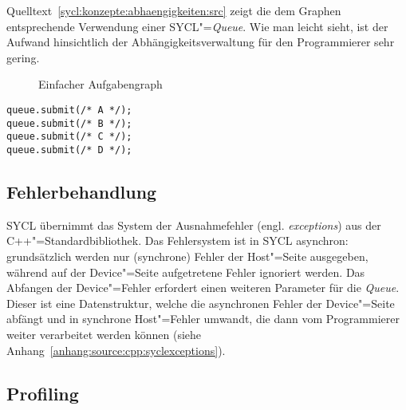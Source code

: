 Quelltext~\ref{sycl:konzepte:abhaengigkeiten:src} zeigt die dem Graphen
entsprechende Verwendung einer SYCL"=\textit{Queue}. Wie man leicht sieht, ist
der Aufwand hinsichtlich der Abhängigkeitsverwaltung für den Programmierer sehr
gering.

\begin{figure}
    \centering
    \caption{Einfacher Aufgabengraph}
    \label{sycl:konzepte:abhaengigkeiten:graph}
\end{figure}

\begin{code}
    \begin{verbatim}
queue.submit(/* A */);
queue.submit(/* B */);
queue.submit(/* C */);
queue.submit(/* D */);
    \end{verbatim}
    \caption{Einfacher SYCL-Aufgabengraph}
    \label{sycl:konzepte:abhaengigkeiten:src}
\end{code}

\subsection{Fehlerbehandlung}

SYCL übernimmt das System der Ausnahmefehler (engl. \textit{exceptions}) aus
der C++"=Standardbibliothek. Das Fehlersystem ist in SYCL asynchron:
grundsätzlich werden nur (synchrone) Fehler der Host"=Seite ausgegeben, während
auf der Device"=Seite aufgetretene Fehler ignoriert werden. Das Abfangen der
Device"=Fehler erfordert einen weiteren Parameter für die \textit{Queue}. Dieser
ist eine Datenstruktur, welche die asynchronen Fehler der Device"=Seite abfängt
und in synchrone Host"=Fehler umwandt, die dann vom Programmierer weiter
verarbeitet werden können (siehe Anhang~\ref{anhang:source:cpp:syclexceptions}).

\subsection{Profiling}

